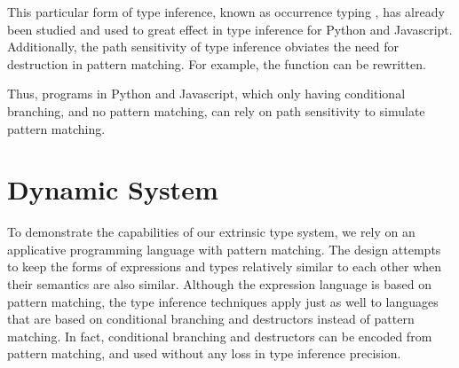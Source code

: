 \documentclass[table,dvipsnames,acmsmall]{acmart}
\theoremstyle{definition}
\begin{document}
\noindent
This particular form of type inference, known as occurrence typing \cite{},
has already been studied and used to great effect in type inference for Python and Javascript.
Additionally, the path sensitivity of type inference obviates the need 
for destruction in pattern matching.  
For example, the  function can be rewritten.

\examp{
  \J{def repeat = [x => loop([self => [n =>}
  \\
  \I\J{n |> [}
  \\
  \I\I \J{[zero;\_ => nil;(n.zero)]}
  \\
  \I\I \J{[succ;\_ => cons;(x,self(n.succ))]}
  \\
  \I \J{]}
  \\
  \J{])]}
}

\noindent
Thus, programs in Python and Javascript, which only having conditional branching,
and no pattern matching, can rely on path sensitivity to simulate pattern matching. 








\section{Dynamic System}
\label{sec:dynamic_system}

\noindent
To demonstrate the capabilities of our extrinsic type system, 
we rely on an applicative programming language with pattern matching.
The design attempts to keep the forms of expressions and types relatively 
similar to each other when their semantics are also similar. 
Although the expression language is based on pattern matching, 
the type inference techniques apply just as well to languages
that are based on conditional branching and destructors instead of pattern matching.
In fact, conditional branching and destructors can be encoded from pattern matching,
and used without any loss in type inference precision.
\end{document}
